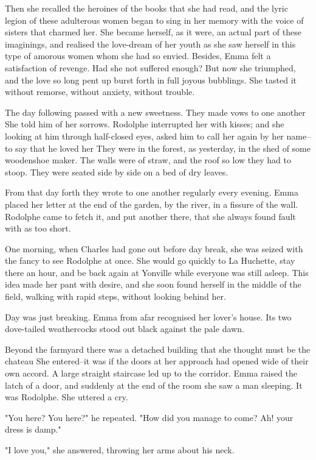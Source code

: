 \documentclass[11pt,twocolumn]{ltugboat}
\begin{document}
Then she recalled the heroines of the books that she had read, and the
lyric legion of these adulterous women began to sing in her memory with
the voice of sisters that charmed her. She became herself, as it were,
an actual part of these imaginings, and realised the love-dream of her
youth as she saw herself in this type of amorous women whom she had
so envied. Besides, Emma felt a satisfaction of revenge. Had she not
suffered enough? But now she triumphed, and the love so long pent up
burst forth in full joyous bubblings. She tasted it without remorse,
without anxiety, without trouble.

The day following passed with a new sweetness. They made vows to one
another She told him of her sorrows. Rodolphe interrupted her with
kisses; and she looking at him through half-closed eyes, asked him to
call her again by her name--to say that he loved her They were in the
forest, as yesterday, in the shed of some woodenshoe maker. The walls
were of straw, and the roof so low they had to stoop. They were seated
side by side on a bed of dry leaves.

From that day forth they wrote to one another regularly every evening.
Emma placed her letter at the end of the garden, by the river, in a
fissure of the wall. Rodolphe came to fetch it, and put another there,
that she always found fault with as too short.

One morning, when Charles had gone out before day break, she was seized
with the fancy to see Rodolphe at once. She would go quickly to La
Huchette, stay there an hour, and be back again at Yonville while
everyone was still asleep. This idea made her pant with desire, and she
soon found herself in the middle of the field, walking with rapid steps,
without looking behind her.

Day was just breaking. Emma from afar recognised her lover's house. Its
two dove-tailed weathercocks stood out black against the pale dawn.

Beyond the farmyard there was a detached building that she thought must
be the chateau She entered--it was if the doors at her approach had
opened wide of their own accord. A large straight staircase led up to
the corridor. Emma raised the latch of a door, and suddenly at the end
of the room she saw a man sleeping. It was Rodolphe. She uttered a cry.

"You here? You here?" he repeated. "How did you manage to come? Ah! your
dress is damp."

"I love you," she answered, throwing her arms about his neck.
\end{document}
